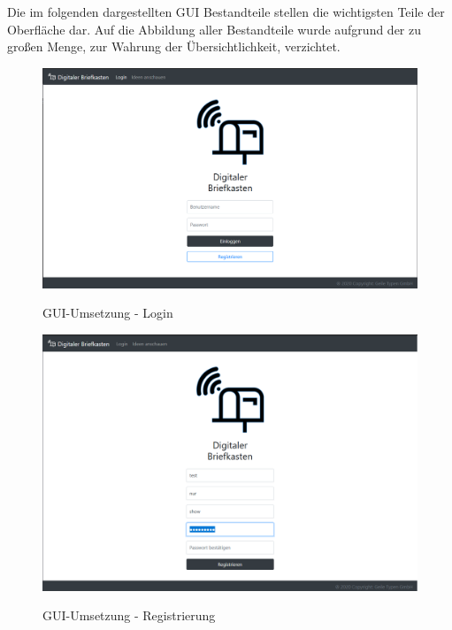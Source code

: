 Die im folgenden dargestellten GUI Bestandteile stellen die wichtigsten Teile der Oberfläche dar. Auf die Abbildung aller Bestandteile wurde aufgrund der zu großen Menge, zur Wahrung der Übersichtlichkeit, verzichtet.

\begin{figure}[h]
    \centering
    \begin{minipage}[t]{1\textwidth}
        \caption{GUI-Umsetzung - Login }
        \includegraphics[width=1\textwidth]{img/login-umsetzung.png}\\
    \end{minipage}
\end{figure}

\begin{figure}[h]
    \centering
    \begin{minipage}[t]{1\textwidth}
        \caption{GUI-Umsetzung - Registrierung }
        \includegraphics[width=1\textwidth]{img/registrierung-umsetzung.png}\\
    \end{minipage}
\end{figure}

